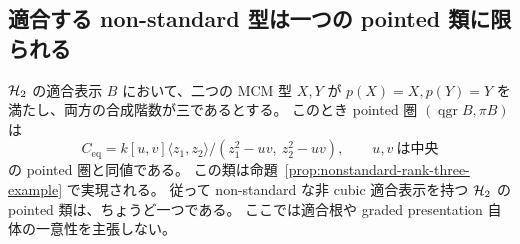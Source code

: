 \subsection{適合する non-standard 型は一つの pointed 類に限られる}
\label{sec:w-compatible-singleton}

\begin{theorem}
\label{thm:w-compatible-singleton}
 $\mathcal H_2$ の適合表示 $B$ において、二つの MCM 型 $X,Y$ が
$p(X)=X,p(Y)=Y$ を満たし、両方の合成階数が三であるとする。
このとき pointed 圏 $(\operatorname{qgr}B,\pi B)$ は
\[
 C_{\mathrm{eq}}
 =k[u,v]\langle z_1,z_2\rangle/
 (z_1^2-uv,\ z_2^2-uv),\qquad u,v\ \text{は中央}
\]
の pointed 圏と同値である。
この類は命題~\ref{prop:nonstandard-rank-three-example} で実現される。
従って non-standard な非 cubic 適合表示を持つ  $\mathcal H_2$ の pointed 類は、ちょうど一つである。
ここでは適合根や graded presentation 自体の一意性を主張しない。
\end{theorem}
